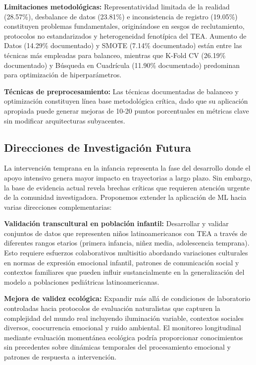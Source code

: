 \documentclass{ieeeaccess}
\begin{document}
	\textbf{Limitaciones metodológicas:} Representatividad limitada de la realidad (28.57\%), desbalance de datos (23.81\%) e inconsistencia de registro (19.05\%) constituyen problemas fundamentales, originándose en sesgos de reclutamiento, protocolos no estandarizados y heterogeneidad fenotípica del TEA. Aumento de Datos (14.29\% documentado) y SMOTE (7.14\% documentado) están entre las técnicas más empleadas para balanceo, mientras que K-Fold CV (26.19\% documentado) y Búsqueda en Cuadrícula (11.90\% documentado) predominan para optimización de hiperparámetros.
	
	\textbf{Técnicas de preprocesamiento:} Las técnicas documentadas de balanceo y optimización constituyen línea base metodológica crítica, dado que su aplicación apropiada puede generar mejoras de 10-20 puntos porcentuales en métricas clave sin modificar arquitecturas subyacentes.
	
	\subsection{Direcciones de Investigación Futura}
	
	La intervención temprana en la infancia representa la fase del desarrollo donde el apoyo intensivo genera mayor impacto en trayectorias a largo plazo. Sin embargo, la base de evidencia actual revela brechas críticas que requieren atención urgente de la comunidad investigadora. Proponemos extender la aplicación de ML hacia varias direcciones complementarias:
	
	\textbf{Validación transcultural en población infantil:} Desarrollar y validar conjuntos de datos que representen niños latinoamericanos con TEA a través de diferentes rangos etarios (primera infancia, niñez media, adolescencia temprana). Esto requiere esfuerzos colaborativos multisitio abordando variaciones culturales en normas de expresión emocional infantil, patrones de comunicación social y contextos familiares que pueden influir sustancialmente en la generalización del modelo a poblaciones pediátricas latinoamericanas.
	
	\textbf{Mejora de validez ecológica:} Expandir más allá de condiciones de laboratorio controladas hacia protocolos de evaluación naturalistas que capturen la complejidad del mundo real incluyendo iluminación variable, contextos sociales diversos, coocurrencia emocional y ruido ambiental. El monitoreo longitudinal mediante evaluación momentánea ecológica podría proporcionar conocimientos sin precedentes sobre dinámicas temporales del procesamiento emocional y patrones de respuesta a intervención.
	
\end{document}
